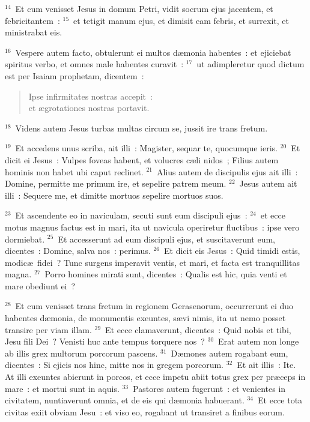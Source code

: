 ${}^{14}$~Et cum venisset Jesus in domum Petri, vidit socrum ejus jacentem, et febricitantem~:
${}^{15}$~et tetigit manum ejus, et dimisit eam febris, et surrexit, et ministrabat eis.


${}^{16}$~Vespere autem facto, obtulerunt ei multos d\ae monia habentes~: et ejiciebat spiritus verbo, et omnes male habentes curavit~:
${}^{17}$~ut adimpleretur quod dictum est per Isaiam prophetam, dicentem~: \begin{flushleft}\begin{verse}Ipse infirmitates nostras accepit~:\\ et \ae grotationes nostras portavit.\end{verse}\end{flushleft}


${}^{18}$~Videns autem Jesus turbas multas circum se, jussit ire trans fretum.


${}^{19}$~Et accedens unus scriba, ait illi~: Magister, sequar te, quocumque ieris.
${}^{20}$~Et dicit ei Jesus~: Vulpes foveas habent, et volucres c\ae li nidos~; Filius autem hominis non habet ubi caput reclinet.
${}^{21}$~Alius autem de discipulis ejus ait illi~: Domine, permitte me primum ire, et sepelire patrem meum.
${}^{22}$~Jesus autem ait illi~: Sequere me, et dimitte mortuos sepelire mortuos suos.


${}^{23}$~Et ascendente eo in naviculam, secuti sunt eum discipuli ejus~:
${}^{24}$~et ecce motus magnus factus est in mari, ita ut navicula operiretur fluctibus~: ipse vero dormiebat.
${}^{25}$~Et accesserunt ad eum discipuli ejus, et suscitaverunt eum, dicentes~: Domine, salva nos~: perimus.
${}^{26}$~Et dicit eis Jesus~: Quid timidi estis, modic\ae\ fidei~? Tunc surgens imperavit ventis, et mari, et facta est tranquillitas magna.
${}^{27}$~Porro homines mirati sunt, dicentes~: Qualis est hic, quia venti et mare obediunt ei~?


${}^{28}$~Et cum venisset trans fretum in regionem Gerasenorum, occurrerunt ei duo habentes d\ae monia, de monumentis exeuntes, s\ae vi nimis, ita ut nemo posset transire per viam illam.
${}^{29}$~Et ecce clamaverunt, dicentes~: Quid nobis et tibi, Jesu fili Dei~? Venisti huc ante tempus torquere nos~?
${}^{30}$~Erat autem non longe ab illis grex multorum porcorum pascens.
${}^{31}$~D\ae mones autem rogabant eum, dicentes~: Si ejicis nos hinc, mitte nos in gregem porcorum.
${}^{32}$~Et ait illis~: Ite. At illi exeuntes abierunt in porcos, et ecce impetu abiit totus grex per pr\ae ceps in mare~: et mortui sunt in aquis.
${}^{33}$~Pastores autem fugerunt~: et venientes in civitatem, nuntiaverunt omnia, et de eis qui d\ae monia habuerant.
${}^{34}$~Et ecce tota civitas exiit obviam Jesu~: et viso eo, rogabant ut transiret a finibus eorum.

